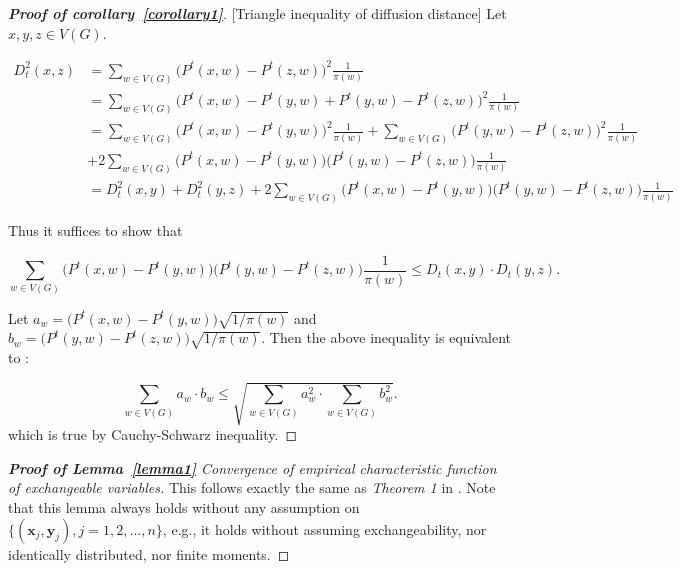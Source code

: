 \documentclass[12pt]{article}
\theoremstyle{definition}
\begin{document}
\begin{proof}[\textbf{Proof of corollary~\ref{corollary1}}][Triangle inequality of diffusion distance]
Let $x, y, z \in V(G).$
	
\begin{equation}
\begin{split}
D^{2}_{t}(x,z) & = \sum\limits_{w \in V(G)} \big( P^{t}(x,w) - P^{t}(z,w)   \big)^2 \frac{1}{\pi(w)}  \\ & = \sum\limits_{w \in V(G)} \big(P^{t}(x, w) - P^{t}(y,w) + P^{t}(y,w) - P^{t}(z,w) \big)^2 \frac{1}{\pi(w)} \\ & = \sum\limits_{w \in V(G)} \big( P^{t}(x,w) - P^{t}(y,w) \big)^2 \frac{1}{\pi(w)}  + \sum\limits_{w \in V(G)} \big( P^{t}(y,w) - P^{t}(z,w)  \big)^2 \frac{1}{\pi(w)} \\ & + 2 \sum\limits_{w \in V(G)} \big( P^{t}(x,w) - P^{t}(y,w)  \big) \big( P^{t}(y,w) - P^{t}(z,w)  \big)\frac{1}{\pi(w)} \\ &= D^{2}_{t}(x,y) + D^{2}_{t}(y,z) +  2 \sum\limits_{w \in V(G)} \big( P^{t}(x,w) - P^{t}(y,w)  \big) \big( P^{t}(y,w) - P^{t}(z,w)  \big)\frac{1}{\pi(w)}   
\end{split}
\end{equation}
	
Thus it suffices to show that 
	
\begin{equation}
\sum\limits_{w \in V(G)} \big( P^{t}(x,w) - P^{t}(y,w)  \big) \big( P^{t}(y,w) - P^{t}(z,w)  \big)\frac{1}{\pi(w)} \leq D_{t}(x,y) \cdot D_{t}(y,z). 
\end{equation}
	
Let $a_{w} = \big(P^{t}(x,w) - P^{t}(y,w) \big) \sqrt{1 / \pi(w)}$ and $b_{w} = \big( P^{t}(y,w) - P^{t}(z,w) \big) \sqrt{1 / \pi(w)}$. Then the above inequality is equivalent to :
	
\begin{equation} 
\sum\limits_{w \in V(G)} a_{w} \cdot b_{w} \leq \sqrt{\sum\limits_{w \in V(G)} a^2_{w} \cdot \sum\limits_{w \in V(G)} b^2_{w} }.
\end{equation}
which is true by Cauchy-Schwarz inequality.
\end{proof}	

\begin{proof}[\textbf{Proof of Lemma~\ref{lemma1}} Convergence of empirical characteristic function of exchangeable variables] 
	
This follows exactly the same as \textit{Theorem 1} in \cite{szekely2007measuring}. Note that this lemma always holds without any assumption on $\{(\mathbf{x}_{j},\mathbf{y}_{j}), j=1,2,...,n\}$, e.g., it holds without assuming exchangeability, nor identically distributed, nor finite moments.
\end{proof}
\end{document}
